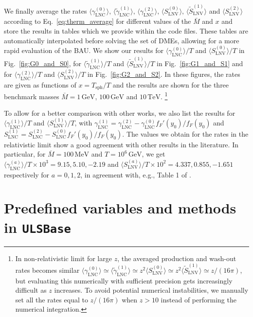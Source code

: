 \documentclass[12pt, a4paper]{article}
\def\Mav{\bar{M}}
\def\sph{\text{sph}}
\def\LNC{\text{LNC}}
\def\LNV{\text{LNV}}
\begin{document}
We finally average the rates $\langle \gamma_{\LNC}^{(0)}\rangle, \,\langle \tilde{\gamma}_{\LNC}^{(1)}\rangle,\, \langle \gamma_{\LNC}^{(2)}\rangle,\,\langle S_{\LNV}^{(0)}\rangle,\,\langle \tilde{S}_{\LNV}^{(1)}\rangle$ and $\langle S_{\LNV}^{(2)}\rangle$ according to Eq.~\eqref{eq:therm_average} for different values of the $\Mav$ and $x$ and store the results in tables which we provide within the code files. These tables are automatically interpolated before solving the set of DMEs, allowing for a more rapid evaluation of the BAU. We show our results for $\langle \gamma_{\LNC}^{(0)}\rangle/T$ and $\langle S_{\LNV}^{(0)}\rangle/T$ in Fig.~\ref{fig:G0_and_S0}, for $\langle \tilde{\gamma}_{\LNC}^{(1)}\rangle/T$ and $\langle \tilde{S}_{\LNV}^{(1)}\rangle/T$ in Fig.~\ref{fig:G1_and_S1} and for $\langle \gamma_{\LNC}^{(2)}\rangle/T$ and $\langle S_{\LNV}^{(2)}\rangle/T$ in Fig.~\ref{fig:G2_and_S2}. In these figures, the rates are given as functions of $x = T_{\sph}/T$ and the results are shown for the three benchmark masses $\Mav = 1\,\text{GeV}$, $100\,\text{GeV}$ and $10\,\text{TeV}$. \footnote{In non-relativistic limit for large $z$, the averaged production and wash-out rates becomes similar $\langle \gamma_{\LNC}^{(0)}\rangle \simeq \langle \tilde{\gamma}_{\LNC}^{(1)}\rangle \simeq z^2 \langle S_{\LNV}^{(0)}\rangle \simeq z^2\langle \tilde{S}_{\LNV}^{(1)}\rangle \simeq z/(16\pi)$, but evaluating this numerically with sufficient precision gets increasingly difficult as $z$ increases. To avoid potential numerical instabilities, we manually set all the rates equal to $z/(16\pi)$ when $z>10$ instead of performing the numerical integration.}

To allow for a better comparison with other works, we also list the results for $\langle {\gamma}_{\LNC}^{(1)}\rangle/T$ and $\langle {S}_{\LNV}^{(1)}\rangle/T$, with $\gamma^{(1)}_{\LNC} = \gamma_{\LNC}^{(2)} - \gamma_{\LNC}^{(0)}f_F'(y_0) /f_F(y_0)$ and $S^{(1)}_{\LNC} = S_{\LNC}^{(2)} - S_{\LNC}^{(0)}f_F'(y_0) /f_F(y_0)$. The values we obtain for the rates in the relativistic limit show a good agreement with other results in the literature. In particular, for $\Mav = 100\,\text{MeV}$ and $T = 10^6\,\text{GeV}$, we get $\langle\gamma_{\LNC}^{(a)}\rangle/T \times 10^3 = 9.15, 5.10, -2.19$ and $\langle S_{\LNV}^{(a)}\rangle/T \times 10^2 = 4.337, 0.855, -1.651$ respectively for $a = 0,1,2$, in agreement with, e.g., Table 1 of \cite{Hernandez:2022ivz}.


\section{Predefined variables and methods in \texttt{ULSBase}}\label{app:ulsbase}
\end{document}
